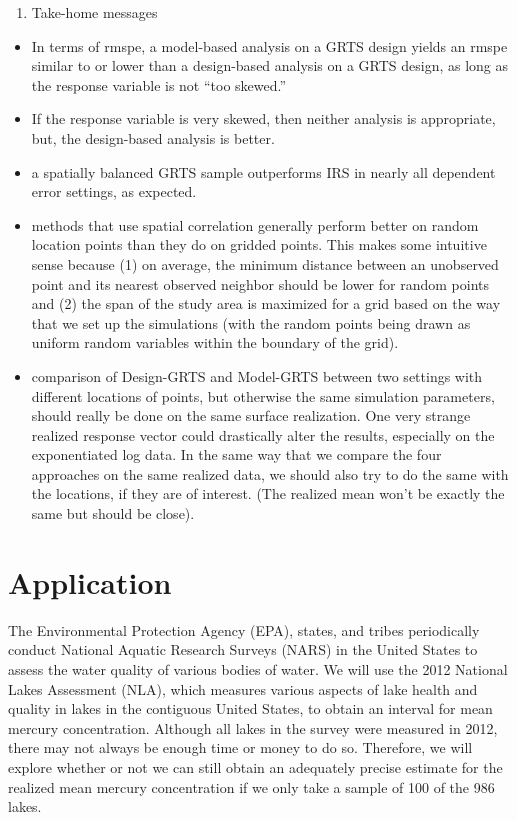 \documentclass[]{elsarticle} %
\providecommand{\tightlist}{%
  \setlength{\itemsep}{0pt}\setlength{\parskip}{0pt}}
\begin{document}
\begin{enumerate}
\def\labelenumi{\arabic{enumi}.}
\setcounter{enumi}{4}
\tightlist
\item
  Take-home messages
\end{enumerate}

\begin{itemize}
\tightlist
\item
  In terms of rmspe, a model-based analysis on a GRTS design yields an
  rmspe similar to or lower than a design-based analysis on a GRTS
  design, as long as the response variable is not ``too skewed.''
\item
  If the response variable is very skewed, then neither analysis is
  appropriate, but, the design-based analysis is better.
\item
  a spatially balanced GRTS sample outperforms IRS in nearly all
  dependent error settings, as expected.
\item
  methods that use spatial correlation generally perform better on
  random location points than they do on gridded points. This makes some
  intuitive sense because (1) on average, the minimum distance between
  an unobserved point and its nearest observed neighbor should be lower
  for random points and (2) the span of the study area is maximized for
  a grid based on the way that we set up the simulations (with the
  random points being drawn as uniform random variables within the
  boundary of the grid).
\item
  comparison of Design-GRTS and Model-GRTS between two settings with
  different locations of points, but otherwise the same simulation
  parameters, should really be done on the same surface realization. One
  very strange realized response vector could drastically alter the
  results, especially on the exponentiated log data. In the same way
  that we compare the four approaches on the same realized data, we
  should also try to do the same with the locations, if they are of
  interest. (The realized mean won't be exactly the same but should be
  close).
\end{itemize}

\hypertarget{application}{%
\section{Application}\label{application}}

The Environmental Protection Agency (EPA), states, and tribes
periodically conduct National Aquatic Research Surveys (NARS) in the
United States to assess the water quality of various bodies of water. We
will use the 2012 National Lakes Assessment (NLA), which measures
various aspects of lake health and quality in lakes in the contiguous
United States, to obtain an interval for mean mercury concentration.
Although all lakes in the survey were measured in 2012, there may not
always be enough time or money to do so. Therefore, we will explore
whether or not we can still obtain an adequately precise estimate for
the realized mean mercury concentration if we only take a sample of 100
of the 986 lakes.
\end{document}
